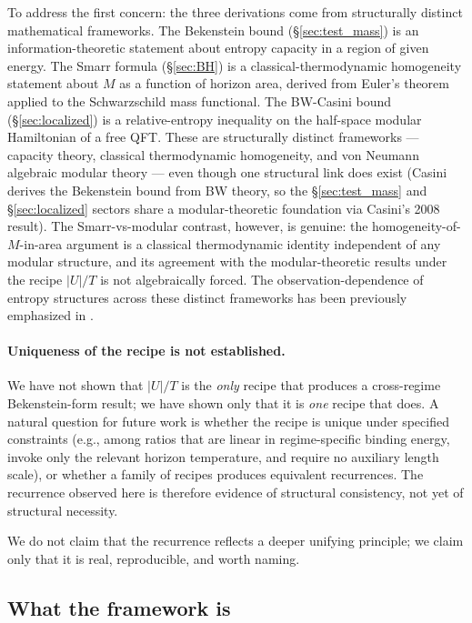 \documentclass[11pt]{article}
\begin{document}
To address the first concern: the three derivations come from structurally distinct mathematical frameworks. The Bekenstein bound (\S\ref{sec:test_mass}) is an information-theoretic statement about entropy capacity in a region of given energy. The Smarr formula (\S\ref{sec:BH}) is a classical-thermodynamic homogeneity statement about $M$ as a function of horizon area, derived from Euler's theorem applied to the Schwarzschild mass functional. The BW-Casini bound (\S\ref{sec:localized}) is a relative-entropy inequality on the half-space modular Hamiltonian of a free QFT. These are structurally distinct frameworks — capacity theory, classical thermodynamic homogeneity, and von Neumann algebraic modular theory — even though one structural link does exist (Casini derives the Bekenstein bound from BW theory, so the \S\ref{sec:test_mass} and \S\ref{sec:localized} sectors share a modular-theoretic foundation via Casini's 2008 result). The Smarr-vs-modular contrast, however, is genuine: the homogeneity-of-$M$-in-area argument is a classical thermodynamic identity independent of any modular structure, and its agreement with the modular-theoretic results under the recipe $|U|/T$ is not algebraically forced. The observation-dependence of entropy structures across these distinct frameworks has been previously emphasized in \cite{Marolf2003}.

\paragraph{Uniqueness of the recipe is not established.} We have not shown that $|U|/T$ is the \emph{only} recipe that produces a cross-regime Bekenstein-form result; we have shown only that it is \emph{one} recipe that does. A natural question for future work is whether the recipe is unique under specified constraints (e.g., among ratios that are linear in regime-specific binding energy, invoke only the relevant horizon temperature, and require no auxiliary length scale), or whether a family of recipes produces equivalent recurrences. The recurrence observed here is therefore evidence of structural consistency, not yet of structural necessity.

We do not claim that the recurrence reflects a deeper unifying principle; we claim only that it is real, reproducible, and worth naming.

\subsection{What the framework is}
\end{document}
